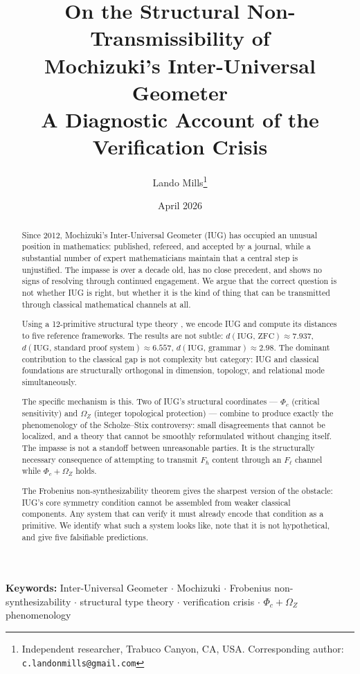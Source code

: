 \documentclass[12pt]{article}
\title{%
  \textbf{On the Structural Non-Transmissibility of\\[4pt]Mochizuki's Inter-Universal Geometer}\\[6pt]
  \large A Diagnostic Account of the Verification Crisis
}
\author{Lando Mills\thanks{Independent researcher, Trabuco Canyon, CA, USA.
  Corresponding author: \texttt{c.landonmills@gmail.com}}}
\date{April 2026}
\theoremstyle{plain}
\theoremstyle{definition}
\theoremstyle{remark}
\begin{document}
\maketitle

\begin{abstract}
Since 2012, Mochizuki's Inter-Universal Geometer (IUG) has occupied an unusual position
in mathematics: published, refereed, and accepted by a journal, while a substantial number
of expert mathematicians maintain that a central step is unjustified. The impasse is over a
decade old, has no close precedent, and shows no signs of resolving through continued
engagement. We argue that the correct question is not whether IUG is right, but whether it
is the kind of thing that can be transmitted through classical mathematical channels at all.

Using a 12-primitive structural type theory \cite{synthref}, we encode IUG and compute
its distances to five reference frameworks. The results are not subtle:
$d(\text{IUG},\,\text{ZFC}) \approx 7.937$,
$d(\text{IUG},\,\text{standard proof system}) \approx 6.557$,
$d(\text{IUG},\,\text{grammar}) \approx 2.98$.
The dominant contribution to the classical gap is not complexity but category: IUG and
classical foundations are structurally orthogonal in dimension, topology, and relational mode
simultaneously.

The specific mechanism is this. Two of IUG's structural coordinates --- $\Phi_c$ (critical
sensitivity) and $\Omega_Z$ (integer topological protection) --- combine to produce exactly
the phenomenology of the Scholze--Stix controversy: small disagreements that cannot be
localized, and a theory that cannot be smoothly reformulated without changing itself.
The impasse is not a standoff between unreasonable parties. It is the structurally
necessary consequence of attempting to transmit $F_\hbar$ content through an $F_\ell$ channel
while $\Phi_c + \Omega_Z$ holds.

The Frobenius non-synthesizability theorem gives the sharpest version of the obstacle:
IUG's core symmetry condition cannot be assembled from weaker classical components.
Any system that can verify it must already encode that condition as a primitive.
We identify what such a system looks like, note that it is not hypothetical, and give
five falsifiable predictions.
\end{abstract}

\noindent\textbf{Keywords:} Inter-Universal Geometer $\cdot$ Mochizuki $\cdot$
Frobenius non-synthesizability $\cdot$ structural type theory $\cdot$ verification crisis
$\cdot$ $\Phi_c + \Omega_Z$ phenomenology
\end{document}
